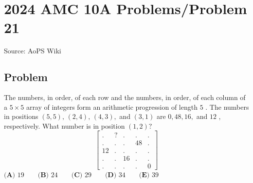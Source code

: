 \documentclass[12pt]{article}
\begin{document}
\section*{{2024 AMC 10A Problems/Problem 21}}
Source: AoPS Wiki

\subsection*{Problem}
The numbers, in order, of each row and the numbers, in order, of each column of a $5 \times 5$ array of integers form an arithmetic progression of length $5$ . The numbers in positions $(5, 5), \,(2,4),\,(4,3),$ and $(3, 1)$ are $0, 48, 16,$ and $12$ , respectively. What number is in position $(1, 2)?$ \[\begin{bmatrix} . & ? &.&.&. \\ .&.&.&48&.\\ 12&.&.&.&.\\ .&.&16&.&.\\ .&.&.&.&0\end{bmatrix}\] $\textbf{(A) } 19 \qquad \textbf{(B) } 24 \qquad \textbf{(C) } 29 \qquad \textbf{(D) } 34 \qquad \textbf{(E) } 39$
\end{document}
